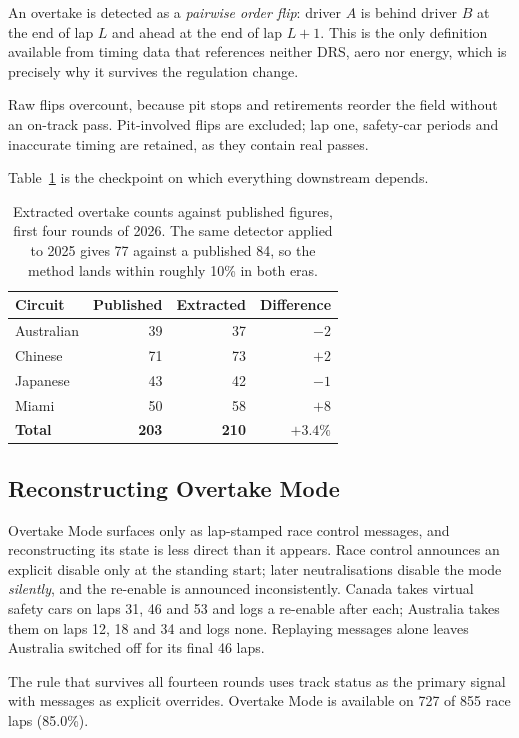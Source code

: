 \documentclass[11pt,a4paper]{article}
\begin{document}
An overtake is detected as a \emph{pairwise order flip}: driver $A$ is behind
driver $B$ at the end of lap $L$ and ahead at the end of lap $L+1$. This is the
only definition available from timing data that references neither DRS, aero nor
energy, which is precisely why it survives the regulation change.

Raw flips overcount, because pit stops and retirements reorder the field without
an on-track pass. Pit-involved flips are excluded; lap one, safety-car periods
and inaccurate timing are retained, as they contain real passes.

Table~\ref{tab:validation} is the checkpoint on which everything downstream
depends.

\begin{table}[htbp]
\centering
\small
\caption{Extracted overtake counts against published figures, first four rounds
of 2026. The same detector applied to 2025 gives 77 against a published
84, so the method lands within roughly 10\% in both eras.}
\label{tab:validation}
\begin{tabular}{lrrr}
\toprule
Circuit & Published & Extracted & Difference \\
\midrule
Australian & 39 & 37 & $-2$ \\
Chinese    & 71 & 73 & $+2$ \\
Japanese   & 43 & 42 & $-1$ \\
Miami      & 50 & 58 & $+8$ \\
\midrule
\textbf{Total} & \textbf{203} & \textbf{210} & $+3.4\%$ \\
\bottomrule
\end{tabular}
\end{table}

\subsection{Reconstructing Overtake Mode}

Overtake Mode surfaces only as lap-stamped race control messages, and
reconstructing its state is less direct than it appears. Race control announces
an explicit disable only at the standing start; later neutralisations disable the
mode \emph{silently}, and the re-enable is announced inconsistently. Canada takes
virtual safety cars on laps 31, 46 and 53 and logs a re-enable
after each; Australia takes them on laps 12, 18 and 34 and logs
none. Replaying messages alone leaves Australia switched off for its final
46 laps.

The rule that survives all fourteen rounds uses track status as the primary
signal with messages as explicit overrides. Overtake Mode is available on
727 of 855 race laps (85.0\%).
\end{document}
